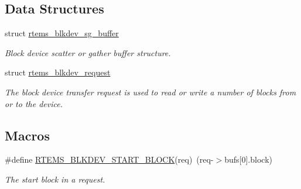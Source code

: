\subsection*{Data Structures}
\begin{DoxyCompactItemize}
\item 
struct \mbox{\hyperlink{structrtems__blkdev__sg__buffer}{rtems\+\_\+blkdev\+\_\+sg\+\_\+buffer}}
\begin{DoxyCompactList}\small\item\em Block device scatter or gather buffer structure. \end{DoxyCompactList}\item 
struct \mbox{\hyperlink{structrtems__blkdev__request}{rtems\+\_\+blkdev\+\_\+request}}
\begin{DoxyCompactList}\small\item\em The block device transfer request is used to read or write a number of blocks from or to the device. \end{DoxyCompactList}\end{DoxyCompactItemize}
\subsection*{Macros}
\begin{DoxyCompactItemize}
\item 
\#define \mbox{\hyperlink{group__rtems__blkdev_ga1dd3697d64b56629c38f43b1f5615914}{R\+T\+E\+M\+S\+\_\+\+B\+L\+K\+D\+E\+V\+\_\+\+S\+T\+A\+R\+T\+\_\+\+B\+L\+O\+CK}}(req)~(req-\/$>$bufs\mbox{[}0\mbox{]}.block)
\begin{DoxyCompactList}\small\item\em The start block in a request. \end{DoxyCompactList}\end{DoxyCompactItemize}
